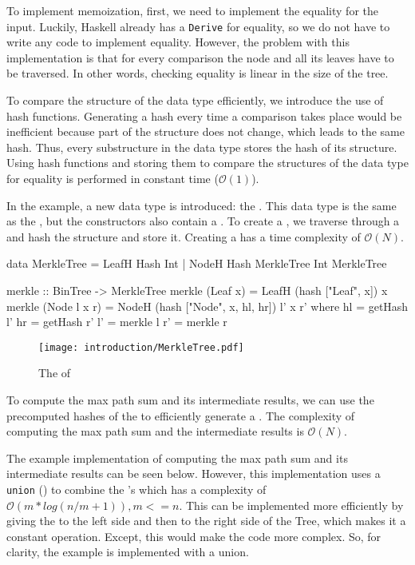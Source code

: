 To implement memoization, first, we need to implement the equality for the input. Luckily, Haskell already has a \texttt{Derive} for equality, so we do not have to write any code to implement equality. However, the problem with this implementation is that for every comparison the node and all its leaves have to be traversed. In other words, checking equality is linear in the size of the tree.  

To compare the structure of the data type efficiently, we introduce the use of hash functions. Generating a hash every time a comparison takes place would be inefficient because part of the structure does not change, which leads to the same hash. Thus, every substructure in the data type stores the hash of its structure. Using hash functions and storing them to compare the structures of the data type for equality is performed in constant time ($\mathcal{O}(1)$).

In the example, a new data type is introduced: the . This data type is the same as the , but the constructors also contain a . To create a , we traverse through a  and hash the structure and store it. Creating a  has a time complexity of $\mathcal{O}(N)$.

\begin{haskell}
data MerkleTree = LeafH Hash Int
                | NodeH Hash MerkleTree Int MerkleTree

merkle :: BinTree -> MerkleTree
merkle (Leaf x)     = LeafH (hash ["Leaf", x]) x
merkle (Node l x r) = NodeH (hash ["Node", x, hl, hr]) l' x r'
  where
    hl = getHash l'
    hr = getHash r'
    l' = merkle l
    r' = merkle r
\end{haskell}

\begin{figure}[H]
    \centering
    \texttt{[image: introduction/MerkleTree.pdf]}
    \caption{The  of }
\end{figure}

To compute the max path sum and its intermediate results, we can use the precomputed hashes of the  to efficiently generate a . The complexity of computing the max path sum and the intermediate results is $\mathcal{O}(N)$.   

The example implementation of computing the max path sum and its intermediate results can be seen below. However, this implementation uses a \texttt{union} (\inlinehaskell{<>}) to combine the 's which has a complexity of $\mathcal{O}(m*log(n/m + 1)), m <= n$. This can be implemented more efficiently by giving the  to the left side and then to the right side of the Tree, which makes it a constant operation. Except, this would make the code more complex. So, for clarity, the example is implemented with a union.

